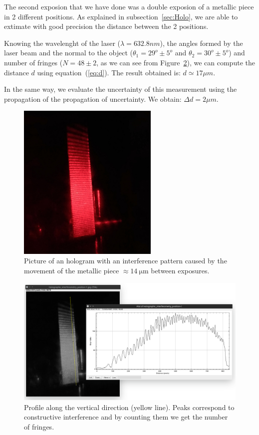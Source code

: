 \documentclass[11pt,a4paper]{article}
\begin{document}
The second exposion that we have done was a double exposion of a metallic piece in 2 different positions. As explained in subsection~\ref{sec:Holo}, we are able to extimate with good precision the distance between the 2 positions. 

Knowing the wavelenght of the laser ($\lambda =632.8nm$), the angles formed by the laser beam and the normal to the object ($\theta_1 =29^o \pm 5^o$ and $\theta_2 =30^o \pm 5^o$) and number of fringes ($N=48 \pm 2$, as we can see from Figure~\ref{fig:holographic_interferometry_position_fringes}), we can compute the distance $d$ using equation~(\ref{eq:d}). The result obtained is: $d \simeq 17\mu m$.

In the same way, we evaluate the uncertainty of this measurement using the propagation of the propagation of uncertainty. We obtain: $\Delta d=2\mu m$.

\begin{figure}[ht]
\centering
\includegraphics[width=0.6\textwidth]{Holographic_interferometry_position}
\caption{Picture of an hologram with an interference pattern caused by the movement of the metallic piece $\approx\SI{14}{\micro \m}$ between exposures.}
\label{fig:holographic_interferometry_position}
\end{figure}

\begin{figure}[ht]
\centering
\includegraphics[width=\textwidth]{Holographic_interferometry_position_fringes}
\caption{Profile along the vertical direction (yellow line). Peaks correspond to constructive interference and by counting them we get the number of fringes.}
\label{fig:holographic_interferometry_position_fringes}
\end{figure}
\end{document}
